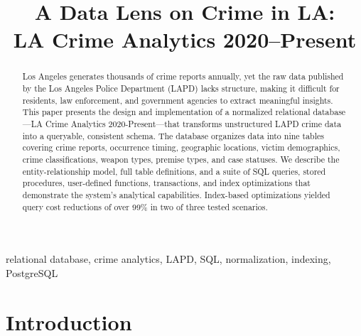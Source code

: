 \documentclass[conference]{IEEEtran}
\begin{document}
\title{A Data Lens on Crime in LA:\\LA Crime Analytics 2020--Present}

\author{
\and
{}
}

\maketitle

\begin{abstract}
Los Angeles generates thousands of crime reports annually, yet the raw data published by the Los Angeles Police Department (LAPD) lacks structure, making it difficult for residents, law enforcement, and government agencies to extract meaningful insights. This paper presents the design and implementation of a normalized relational database---LA Crime Analytics 2020-Present---that transforms unstructured LAPD crime data into a queryable, consistent schema. The database organizes data into nine tables covering crime reports, occurrence timing, geographic locations, victim demographics, crime classifications, weapon types, premise types, and case statuses. We describe the entity-relationship model, full table definitions, and a suite of SQL queries, stored procedures, user-defined functions, transactions, and index optimizations that demonstrate the system's analytical capabilities. Index-based optimizations yielded query cost reductions of over 99\% in two of three tested scenarios.
\end{abstract}

\begin{IEEEkeywords}
relational database, crime analytics, LAPD, SQL, normalization, indexing, PostgreSQL
\end{IEEEkeywords}

\section{Introduction}
\end{document}
